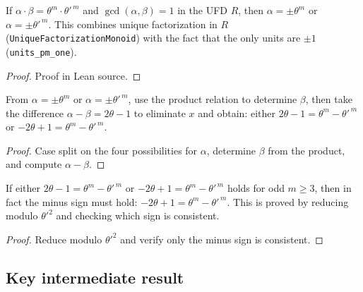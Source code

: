 \begin{lemma}
  \label{lem:ufd_power_association}
  \leanok
  If $\alpha \cdot \beta = \theta^m \cdot \theta'^{\,m}$ and $\gcd(\alpha, \beta) = 1$ in the
  UFD $R$, then $\alpha = \pm\theta^m$ or $\alpha = \pm\theta'^{\,m}$.
  This combines unique factorization in $R$ (\texttt{UniqueFactorizationMonoid}) with the
  fact that the only units are $\pm 1$ (\texttt{units\_pm\_one}).
\end{lemma}
\begin{proof}\leanok
  Proof in Lean source.
\end{proof}

\begin{lemma}[Eliminate $x$]
  \label{lem:eliminate_x_conclude}
  \leanok
  From $\alpha = \pm\theta^m$ or $\alpha = \pm\theta'^{\,m}$, use the product relation to
  determine $\beta$, then take the difference $\alpha - \beta = 2\theta - 1$ to
  eliminate $x$ and obtain: either $2\theta - 1 = \theta^m - \theta'^{\,m}$ or
  $-2\theta + 1 = \theta^m - \theta'^{\,m}$.
\end{lemma}
\begin{proof}\leanok
  Case split on the four possibilities for $\alpha$, determine $\beta$ from
  the product, and compute $\alpha - \beta$.
\end{proof}

\begin{lemma}
  \label{lem:must_have_minus_sign}
  \leanok
  If either $2\theta - 1 = \theta^m - \theta'^{\,m}$ or $-2\theta + 1 = \theta^m - \theta'^{\,m}$
  holds for odd $m \geq 3$, then in fact the minus sign must hold:
  $-2\theta + 1 = \theta^m - \theta'^{\,m}$.
  This is proved by reducing modulo $\theta'^2$ and checking which sign is consistent.
\end{lemma}
\begin{proof}\leanok
  Reduce modulo $\theta'^2$ and verify only the minus sign is consistent.
\end{proof}

\subsection{Key intermediate result}

